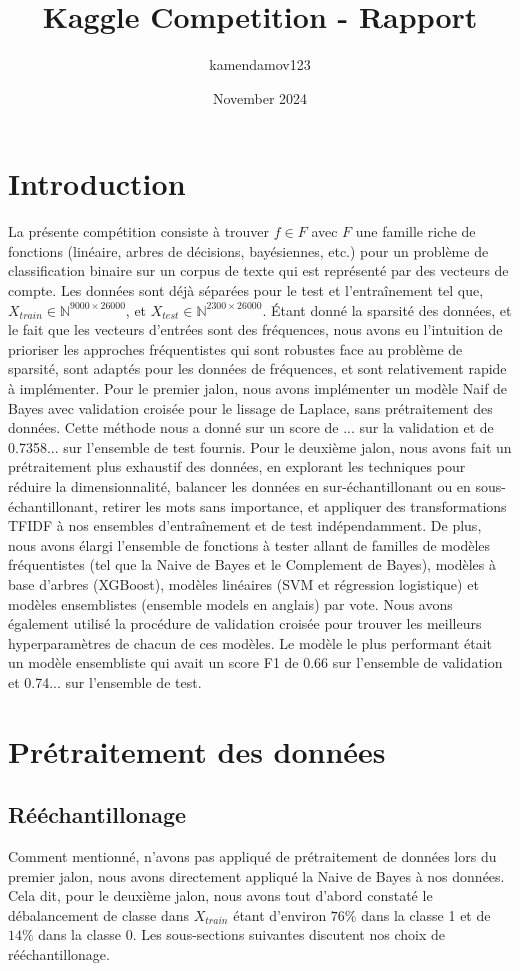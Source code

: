 \documentclass{article}
\title{Kaggle Competition - Rapport}
\author{kamendamov123 }
\date{November 2024}
\begin{document}
\maketitle

\section{Introduction}
La présente compétition consiste à trouver $f \in F$ avec $F$ une famille riche de fonctions (linéaire, arbres de décisions, bayésiennes, etc.) pour un problème de classification binaire sur un corpus de texte qui est représenté par des vecteurs de compte. Les données sont déjà séparées pour le test et l'entraînement tel que, $X_{train} \in \mathbb{N}^{9000 \times 26000}$, et $X_{test} \in \mathbb{N}^{2300 \times 26000}$. Étant donné la sparsité des données, et le fait que les vecteurs d'entrées sont des fréquences, nous avons eu l'intuition de prioriser les approches fréquentistes qui sont robustes face au problème de sparsité, sont adaptés pour les données de fréquences, et sont relativement rapide à implémenter. Pour le premier jalon, nous avons implémenter un modèle Naif de Bayes avec validation croisée pour le lissage de Laplace, sans prétraitement des données. Cette méthode nous a donné sur un score de ... sur la validation et de 0.7358... sur l'ensemble de test fournis. Pour le deuxième jalon, nous avons fait un prétraitement plus exhaustif des données, en explorant les techniques pour réduire la dimensionnalité, balancer les données en sur-échantillonant ou en sous-échantillonant, retirer les mots sans importance, et appliquer des transformations TFIDF à nos ensembles d'entraînement et de test indépendamment. De plus, nous avons élargi l'ensemble de fonctions à tester allant de familles de modèles fréquentistes (tel que la Naive de Bayes et le Complement de Bayes), modèles à base d'arbres (XGBoost), modèles linéaires (SVM et régression logistique) et modèles ensemblistes (ensemble models en anglais) par vote. Nous avons également utilisé la procédure de validation croisée pour trouver les meilleurs hyperparamètres de chacun de ces modèles. Le modèle le plus performant était un modèle ensembliste qui avait un score F1 de 0.66 sur l'ensemble de validation et 0.74... sur l'ensemble de test.    

\section{Prétraitement des données}
\subsection{Rééchantillonage}
Comment mentionné, n'avons pas appliqué de prétraitement de données lors du premier jalon, nous avons directement appliqué la Naive de Bayes à nos données. Cela dit, pour le deuxième jalon, nous avons tout d'abord constaté le débalancement de classe dans $X_{train}$ étant d'environ $76\%$ dans la classe 1 et de $14\%$ dans la classe 0. Les sous-sections suivantes discutent nos choix de rééchantillonage.
\end{document}

